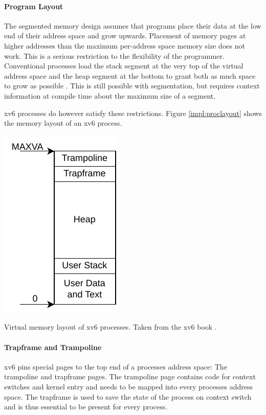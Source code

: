 \paragraph{Program Layout} The segmented memory design assumes that programs place their data at the low end of their address
space and grow upwards.
Placement of memory pages at higher addresses than the maximum per-address space memory size does not work. This is a serious restriction to the flexibility of the programmer. Conventional processes load the stack segment at the very top of the virtual address space and the heap segment at the bottom to grant both as much space to grow as possible \cite{tanenbaumOS}. This is still possible with segmentation, but requires context information at compile time about the maximum size of a segment.

xv6 processes do however satisfy these restrictions. Figure \ref{impl:proclayout} shows the memory layout
of an xv6 process.

\begin{marginfigure}
    \centering
    \includegraphics[scale=.8]{figures/prog_vm.pdf}
    \caption[xv6 memory layout]{Virtual memory layout of xv6 processes. Taken from the xv6 book \cite{cox2011xv6}.}
    \label{impl:proclayout}
\end{marginfigure}


\paragraph{Trapframe and Trampoline} xv6 pins special pages to the top end of a processes address space: The trampoline and trapframe pages.
The trampoline page contains code for context switches and kernel entry and needs to be mapped
into every processes address space.
The trapframe is used to save the state of the process on context switch and is thus essential to be present for every process.

